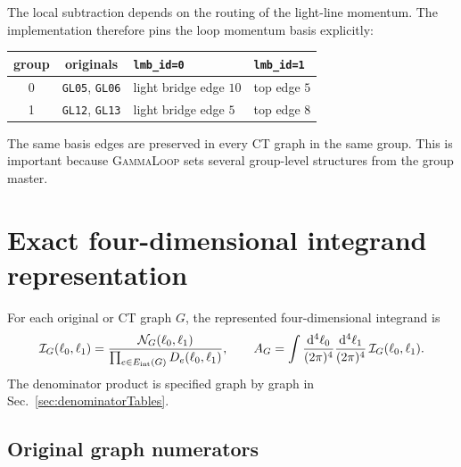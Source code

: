 \documentclass[11pt]{article}
\newcommand{\dd}{\mathrm{d}}
\newcommand{\GammaLoop}{\textsc{GammaLoop}}
\newcommand{\N}{\mathcal{N}}
\newcommand{\I}{\mathcal{I}}
\begin{document}
The local subtraction depends on the routing of the light-line momentum.  The
implementation therefore pins the loop momentum basis explicitly:
\begin{center}
\begin{tabular}{ccll}
\toprule
group & originals & \texttt{lmb\_id=0} & \texttt{lmb\_id=1}\\
\midrule
0 & \texttt{GL05}, \texttt{GL06} & light bridge edge \(10\) & top edge \(5\)\\
1 & \texttt{GL12}, \texttt{GL13} & light bridge edge \(5\) & top edge \(8\)\\
\bottomrule
\end{tabular}
\end{center}
The same basis edges are preserved in every CT graph in the same group.  This
is important because \GammaLoop{} sets several group-level structures from the
group master.

\section{Exact four-dimensional integrand representation}

For each original or CT graph \(G\), the represented four-dimensional
integrand is
\begin{equation}
  \I_G(\ell_0,\ell_1)
  =
  \frac{\N_G(\ell_0,\ell_1)}
       {\prod_{e\in E_{\rm int}(G)}D_e(\ell_0,\ell_1)} ,
  \qquad
  A_G=\int\frac{\dd^4\ell_0}{(2\pi)^4}
          \frac{\dd^4\ell_1}{(2\pi)^4}\,
          \I_G(\ell_0,\ell_1).
  \label{eq:generalIntegrand}
\end{equation}
The denominator product is specified graph by graph in
Sec.~\ref{sec:denominatorTables}.

\subsection{Original graph numerators}
\end{document}
